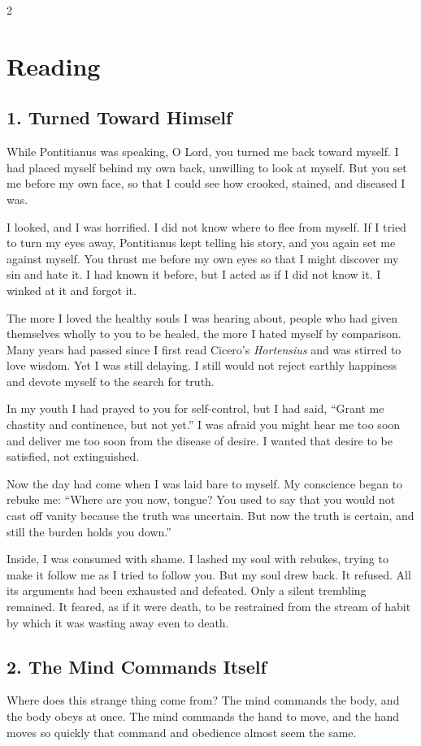 \documentclass[12pt]{article}
\begin{document}
\begin{multicols}{2}
\section*{Reading}

\subsection*{1. Turned Toward Himself}
While Pontitianus was speaking, O Lord, you turned me back toward myself. I had placed myself behind my own back, unwilling to look at myself. But you set me before my own face, so that I could see how crooked, stained, and diseased I was.

I looked, and I was horrified. I did not know where to flee from myself. If I tried to turn my eyes away, Pontitianus kept telling his story, and you again set me against myself. You thrust me before my own eyes so that I might discover my sin and hate it. I had known it before, but I acted as if I did not know it. I winked at it and forgot it.

The more I loved the healthy souls I was hearing about, people who had given themselves wholly to you to be healed, the more I hated myself by comparison. Many years had passed since I first read Cicero's \textit{Hortensius} and was stirred to love wisdom. Yet I was still delaying. I still would not reject earthly happiness and devote myself to the search for truth.

In my youth I had prayed to you for self-control, but I had said, ``Grant me chastity and continence, but not yet.'' I was afraid you might hear me too soon and deliver me too soon from the disease of desire. I wanted that desire to be satisfied, not extinguished.

Now the day had come when I was laid bare to myself. My conscience began to rebuke me: ``Where are you now, tongue? You used to say that you would not cast off vanity because the truth was uncertain. But now the truth is certain, and still the burden holds you down.''

Inside, I was consumed with shame. I lashed my soul with rebukes, trying to make it follow me as I tried to follow you. But my soul drew back. It refused. All its arguments had been exhausted and defeated. Only a silent trembling remained. It feared, as if it were death, to be restrained from the stream of habit by which it was wasting away even to death.

\subsection*{2. The Mind Commands Itself}
Where does this strange thing come from? The mind commands the body, and the body obeys at once. The mind commands the hand to move, and the hand moves so quickly that command and obedience almost seem the same.


\end{multicols}
\end{document}
